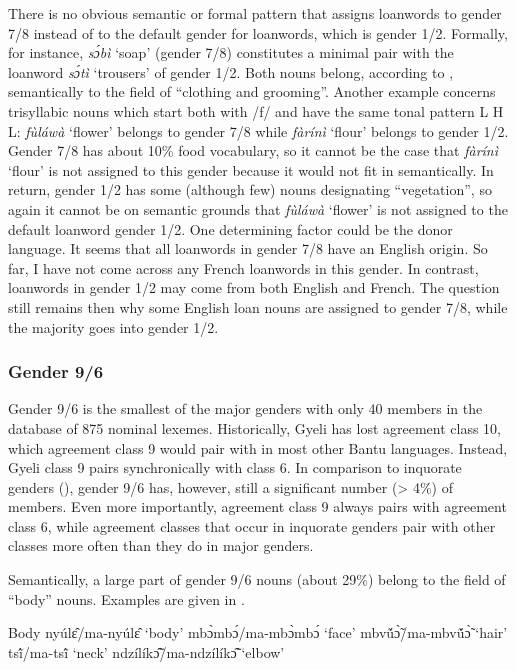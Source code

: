 There is no obvious semantic or formal pattern that assigns loanwords to gender 7/8 instead of to the default gender for loanwords, which is gender 1/2.  Formally, for instance, {\itshape sɔ́bì} `soap' (gender 7/8) constitutes a minimal pair with the loanword {\itshape sɔ́tì} `trousers' of gender 1/2. Both nouns belong, according to \citet{haspelmath2009}, semantically to the field of ``clothing and grooming''. Another example concerns trisyllabic nouns which start both with /f/ and have the same tonal pattern L H L: {\itshape fùláwà} `flower' belongs to gender 7/8 while {\itshape fàrínì} `flour' belongs to gender 1/2. Gender 7/8 has about 10\% food vocabulary, so it cannot be the case that {\itshape fàrínì} `flour' is not assigned to this gender because it would not fit in semantically. In return, gender 1/2 has some (although few) nouns designating ``vegetation'', so again it cannot be on semantic grounds that {\itshape fùláwà} `flower' is not assigned to the default loanword gender 1/2. One determining factor could be the donor language. It seems that all loanwords in gender 7/8 have an English origin. So far, I have not come across any French loanwords in this gender. In contrast, loanwords in gender 1/2 may come from both English and French. The question still remains then why some English loan nouns are assigned to gender 7/8, while the majority goes into gender 1/2.

\subsubsection{Gender 9/6}
\label{sec:9/6}

Gender 9/6 is the smallest of the major genders with only 40 members in the database of  875 nominal lexemes. Historically, Gyeli has lost agreement class 10, which agreement class 9 would pair with in most other Bantu languages. Instead, Gyeli class 9 pairs synchronically with class 6. In comparison to inquorate genders (), gender 9/6 has, however, still a significant number (> 4\%) of members. Even more importantly, agreement class 9 always pairs with agreement class 6, while agreement classes that occur in inquorate genders pair with other classes more often than they do in major genders. 

Semantically, a large part of gender 9/6 nouns (about 29\%) belong to the field of  ``body'' nouns. Examples are given in .


\ea\label{9/6body} Body
\ea nyúlɛ̂/ma-nyúlɛ̂ `body'
\ex mbɔ̀mbɔ́/ma-mbɔ̀mbɔ́ `face'
\ex mbvṹɔ̃̀/ma-mbvṹɔ̃̀ `hair'
\ex tsĩ́/ma-tsĩ́ `neck'
\ex ndzílíkɔ̃̂/ma-ndzílíkɔ̃̂ `elbow'
\z
\z

